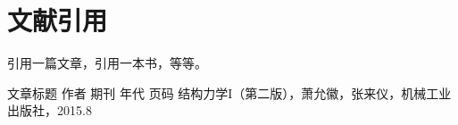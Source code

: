 \documentclass[b5paper,UTF8]{book}
\begin{document}






\chapter{文献引用}

引用一篇文章\cite{article1}，引用一本书\cite{book1}，等等。



\begin{thebibliography}{99} 

 文章标题 作者 期刊 年代 页码 
 结构力学I（第二版），萧允徽，张来仪，机械工业出版社，2015.8 
    
\end{thebibliography} 
\end{document}
